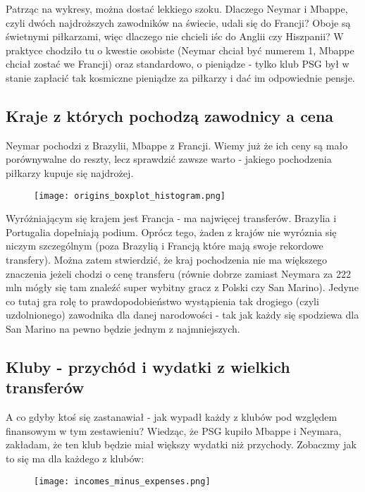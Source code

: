 \documentclass{article}
\begin{document}
Patrząc na wykresy, można dostać lekkiego szoku. Dlaczego Neymar i Mbappe, czyli dwóch najdroższych zawodników na świecie, udali się do Francji? Oboje są świetnymi piłkarzami, więc dlaczego nie chcieli iśc do Anglii czy Hiszpanii? W praktyce chodziło tu o kwestie osobiste (Neymar chciał być numerem 1, Mbappe chciał zostać we Francji) oraz standardowo, o pieniądze - tylko klub PSG był w stanie zapłacić tak kosmiczne pieniądze za piłkarzy i dać im odpowiednie pensje.


\subsection{Kraje z których pochodzą zawodnicy a cena}
Neymar pochodzi z Brazylii, Mbappe z Francji. Wiemy już że ich ceny są mało porównywalne do reszty, lecz sprawdzić zawsze warto - jakiego pochodzenia piłkarzy kupuje się najdrożej.

\begin{figure}[H]
    \centering
    \texttt{[image: origins\_boxplot\_histogram.png]}
\end{figure}

Wyróżniającym się krajem jest Francja - ma najwięcej transferów. Brazylia i Portugalia dopełniają podium. Oprócz tego, żaden z krajów nie wyróznia się niczym szczególnym (poza Brazylią i Francją które mają swoje rekordowe transfery). Można zatem stwierdzić, że kraj pochodzenia nie ma większego znaczenia jeżeli chodzi o cenę transferu (równie dobrze zamiast Neymara za 222 mln mógły się tam znaleźć super wybitny gracz z Polski czy San Marino). Jedyne co tutaj gra rolę to prawdopodobieństwo wystąpienia tak drogiego (czyli uzdolnionego) zawodnika dla danej narodowości - tak jak każdy się spodziewa dla San Marino na pewno będzie jednym z najmniejszych.

\subsection{Kluby - przychód i wydatki z wielkich transferów}
A co gdyby ktoś się zastanawiał - jak wypadł każdy z klubów pod względem finansowym w tym zestawieniu?
Wiedząc, że PSG kupiło Mbappe i Neymara, zakładam, że ten klub będzie miał większy wydatki niż przychody. Zobaczmy jak to się ma dla każdego z klubów:

\begin{figure}[H]
    \centering
    \texttt{[image: incomes\_minus\_expenses.png]}
\end{figure}
\end{document}
